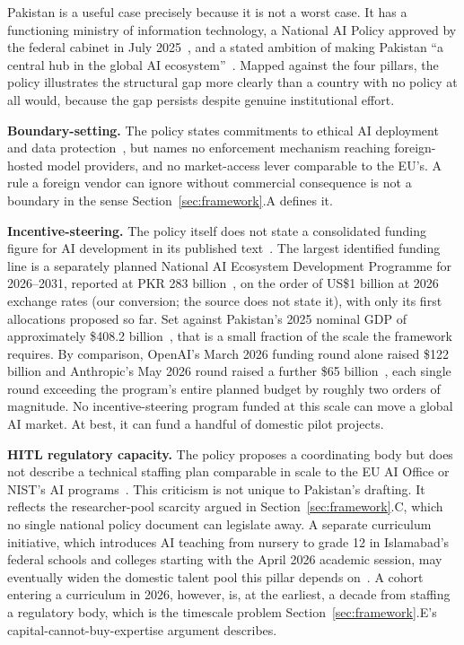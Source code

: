 \documentclass[journal]{IEEEtran}
\begin{document}
Pakistan is a useful case precisely because it is not a worst case. It has a functioning ministry of information technology, a National AI Policy approved by the federal cabinet in July 2025~\cite{dawn2025aipolicyapproval}, and a stated ambition of making Pakistan ``a central hub in the global AI ecosystem''~\cite{pakistan2025nationalaipolicy}.
Mapped against the four pillars, the policy illustrates the structural gap more clearly than a country with no policy at all would, because the gap persists despite genuine institutional effort.

\textbf{Boundary-setting.} The policy states commitments to ethical AI deployment and data protection~\cite{pakistan2025nationalaipolicy},
but names no enforcement mechanism reaching foreign-hosted model providers, and no market-access lever comparable to the EU's. A rule a foreign vendor can ignore without commercial consequence is not a boundary in the sense Section~\ref{sec:framework}.A defines it.

\textbf{Incentive-steering.} The policy itself does not state a consolidated funding figure for AI development in its published text~\cite{pakistan2025nationalaipolicy}. The largest identified funding line is a separately planned National AI Ecosystem Development Programme for 2026--2031, reported at PKR 283 billion~\cite{app2026naiedp}, on the order of US\$1 billion at 2026 exchange rates (our conversion; the source does not state it), with only its first allocations proposed so far. Set against Pakistan's 2025 nominal GDP of approximately \$408.2 billion~\cite{imf2025pakistangdp}, that is a small fraction of the scale the framework requires. By comparison, OpenAI's March 2026 funding round alone raised \$122 billion and Anthropic's May 2026 round raised a further \$65 billion~\cite{openai2026funding,anthropic2026funding}, each single round exceeding the program's entire planned budget by roughly two orders of magnitude. No incentive-steering program funded at this scale can move a global AI market. At best, it can fund a handful of domestic pilot projects.

\textbf{HITL regulatory capacity.} The policy proposes a coordinating body but does not describe a technical staffing plan comparable in scale to the EU AI Office or NIST's AI programs~\cite{pakistan2025nationalaipolicy}.
This criticism is not unique to Pakistan's drafting. It reflects the researcher-pool scarcity argued in Section~\ref{sec:framework}.C, which no single national policy document can legislate away. A separate curriculum initiative, which introduces AI teaching from nursery to grade 12 in Islamabad's federal schools and colleges starting with the April 2026 academic session, may eventually widen the domestic talent pool this pillar depends on~\cite{dawn2026curriculum}. A cohort entering a curriculum in 2026, however, is, at the earliest, a decade from staffing a regulatory body, which is the timescale problem Section~\ref{sec:framework}.E's capital-cannot-buy-expertise argument describes.
\end{document}
